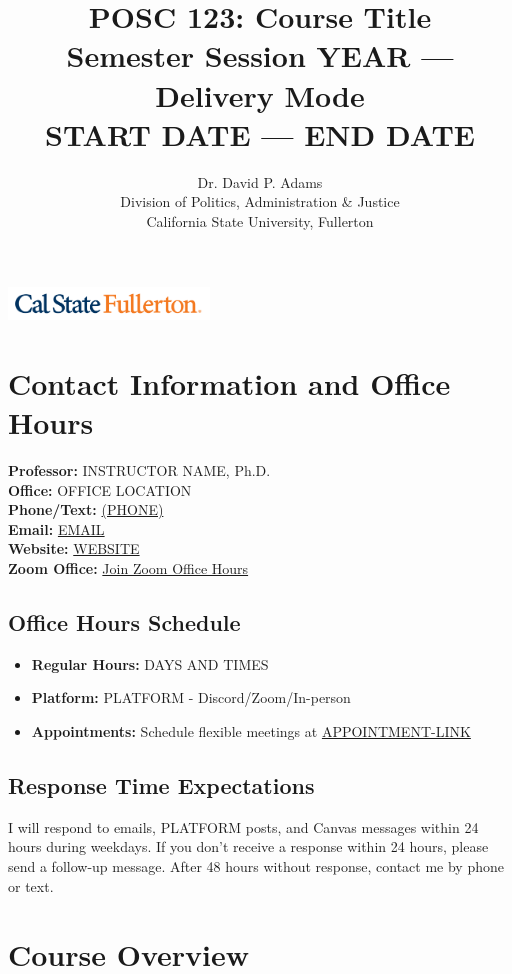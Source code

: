 \documentclass[12pt]{article}
\title{\textbf{POSC 123: Course Title} \\
       \large Semester Session YEAR — Delivery Mode \\
       \normalsize START DATE — END DATE}
\author{Dr. David P. Adams \\
        Division of Politics, Administration \& Justice \\
        California State University, Fullerton}
\date{}
\begin{document}
\maketitle

\begin{center}
\includegraphics[width=0.4\textwidth]{csuf_logo.png}
\end{center}

\section*{Contact Information and Office Hours}

\textbf{Professor:} INSTRUCTOR NAME, Ph.D.\\
\textbf{Office:} OFFICE LOCATION\\
\textbf{Phone/Text:} \href{tel:+1PHONE}{(PHONE)}\\
\textbf{Email:} \href{mailto:EMAIL}{EMAIL}\\
\textbf{Website:} \href{https://WEBSITE}{WEBSITE}\\
\textbf{Zoom Office:} \href{https://ZOOM-LINK}{Join Zoom Office Hours}

\subsection*{Office Hours Schedule}
\begin{itemize}
\item \textbf{Regular Hours:} DAYS AND TIMES
\item \textbf{Platform:} PLATFORM - Discord/Zoom/In-person
\item \textbf{Appointments:} Schedule flexible meetings at \href{https://APPOINTMENT-LINK}{APPOINTMENT-LINK}
\end{itemize}

\subsection*{Response Time Expectations}
I will respond to emails, PLATFORM posts, and Canvas messages within 24 hours during weekdays. If you don't receive a response within 24 hours, please send a follow-up message. After 48 hours without response, contact me by phone or text.

\section*{Course Overview}
\end{document}
